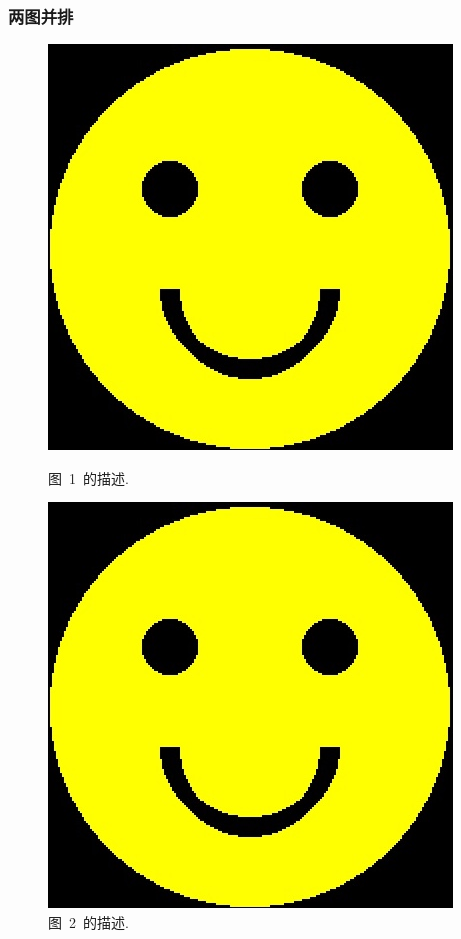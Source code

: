 \documentclass[notheorems,11pt,compress]{beamer}
\numberwithin{figure}{section}
\numberwithin{table}{section}
\numberwithin{equation}{section}
\theoremstyle{plain}
\numberwithin{theorem}{section}
\numberwithin{definition}{section}
\numberwithin{lemma}{section}
\numberwithin{proposition}{section}
\numberwithin{corollary}{section}
\theoremstyle{example}
\begin{document}

\begin{frame}
	\frametitle{两图并排}
	\begin{figure}[htb]
		\centering
		\begin{minipage}{0.48\linewidth}
			\centering
			\includegraphics[width=\linewidth]{image1}
			\caption{图~1~的描述.}
		\end{minipage}\hfill
		\begin{minipage}{0.48\linewidth}
			\centering
			\includegraphics[width=\linewidth]{image2}
			\caption{图~2~的描述.}
		\end{minipage}
	\end{figure}
\end{frame}
\end{document}
